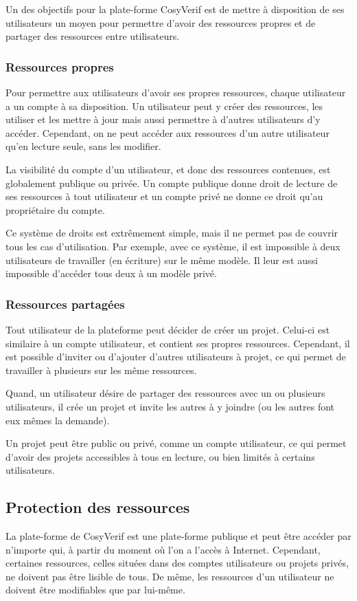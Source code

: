 \documentclass{report}
\begin{document}
Un des objectifs pour la plate-forme CosyVerif est de mettre à disposition de ses utilisateurs un moyen pour permettre
d'avoir des ressources propres et de partager des ressources entre utilisateurs.

\subsubsection{Ressources propres}
Pour permettre aux utilisateurs d'avoir ses propres ressources, chaque
utilisateur a un compte à sa disposition. Un utilisateur peut y créer des ressources, les utiliser et les mettre à jour mais aussi permettre à 
d'autres utilisateurs d'y accéder.
Cependant, on ne peut accéder aux ressources d'un autre utilisateur qu'en
lecture seule, sans les modifier.

La visibilité du compte d'un utilisateur, et donc des ressources contenues,
est globalement publique ou privée.
Un compte publique donne droit de lecture de ses ressources à tout 
utilisateur et un compte privé ne donne ce droit qu'au propriétaire du compte.

Ce système de droits est extrêmement simple, mais il ne permet pas de
couvrir tous les cas d'utilisation. Par exemple, avec ce système, il est
impossible à deux utilisateurs de travailler (en écriture) sur le même
modèle. Il leur est aussi impossible d'accéder tous deux à un modèle privé.

\subsubsection{Ressources partagées}
Tout utilisateur de la plateforme peut décider de créer un projet. Celui-ci
est similaire à un compte utilisateur, et contient ses propres ressources.
Cependant, il est possible d'inviter ou d'ajouter d'autres utilisateurs à
projet, ce qui permet de travailler à plusieurs sur les même ressources.

Quand, un utilisateur
désire de partager des ressources avec un ou plusieurs utilisateurs, il crée un projet et invite les autres à y joindre (ou 
les autres font eux mêmes la demande).

Un projet peut être public ou privé, comme un compte utilisateur,
ce qui permet d'avoir des projets accessibles à tous en lecture, ou bien
limités à certains utilisateurs.


\subsection{Protection des ressources}
La plate-forme de CosyVerif est une plate-forme publique et peut être accéder par n'importe qui, à partir du moment où
l'on a l'accès à Internet.
Cependant, certaines ressources, celles situées dans des comptes utilisateurs ou
projets privés, ne doivent pas être lisible de tous. De même, les ressources
d'un utilisateur ne doivent être modifiables que par lui-même.
\end{document}
